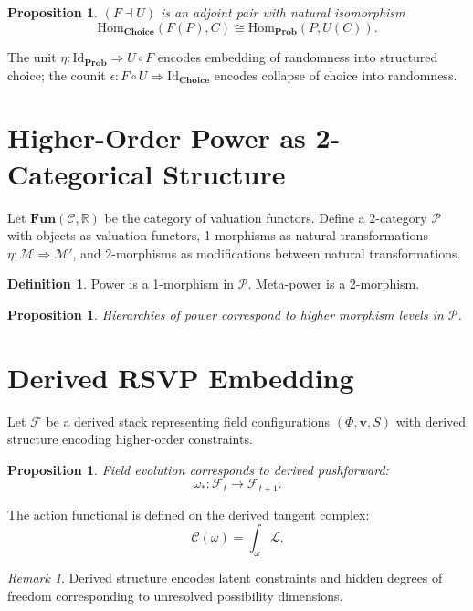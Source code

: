 \documentclass[11pt,a4paper]{article}
\newtheorem{proposition}[theorem]{Proposition}
\theoremstyle{definition}
\newtheorem{definition}[theorem]{Definition}
\theoremstyle{remark}
\newtheorem{remark}[theorem]{Remark}
\begin{document}
\begin{proposition}
$(F \dashv U)$ is an adjoint pair with natural isomorphism
\[
\mathrm{Hom}_{\mathbf{Choice}}(F(P), C) \cong \mathrm{Hom}_{\mathbf{Prob}}(P, U(C)).
\]
\end{proposition}

The unit $\eta : \mathrm{Id}_{\mathbf{Prob}} \Rightarrow U \circ F$ encodes embedding of randomness into structured choice; the counit $\epsilon : F \circ U \Rightarrow \mathrm{Id}_{\mathbf{Choice}}$ encodes collapse of choice into randomness.

\section{Higher-Order Power as 2-Categorical Structure}

Let $\mathbf{Fun}(\mathcal{C}, \mathbb{R})$ be the category of valuation functors. Define a 2-category $\mathcal{P}$ with objects as valuation functors, 1-morphisms as natural transformations $\eta : \mathcal{M} \Rightarrow \mathcal{M}'$, and 2-morphisms as modifications between natural transformations.

\begin{definition}
Power is a 1-morphism in $\mathcal{P}$. Meta-power is a 2-morphism.
\end{definition}

\begin{proposition}
Hierarchies of power correspond to higher morphism levels in $\mathcal{P}$.
\end{proposition}

\section{Derived RSVP Embedding}

Let $\mathcal{F}$ be a derived stack representing field configurations $(\Phi, \mathbf{v}, S)$ with derived structure encoding higher-order constraints.

\begin{proposition}
Field evolution corresponds to derived pushforward:
\[
\omega_* : \mathcal{F}_t \to \mathcal{F}_{t+1}.
\]
\end{proposition}

The action functional is defined on the derived tangent complex:
\[
\mathcal{C}(\omega) = \int_\omega \mathcal{L}.
\]

\begin{remark}
Derived structure encodes latent constraints and hidden degrees of freedom corresponding to unresolved possibility dimensions.
\end{remark}
\end{document}
